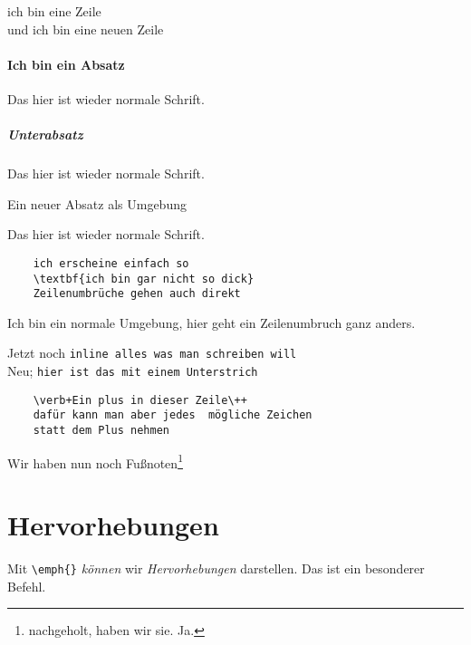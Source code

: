     ich bin eine Zeile\\
    und ich bin eine neuen Zeile
    
    \paragraph{Ich bin ein Absatz \blindtext}
        Das hier ist wieder normale Schrift.
    \subparagraph{Unterabsatz \blindtext}
        Das hier ist wieder normale Schrift.
    
    \begin{paragraph}
        Ein neuer Absatz als Umgebung \blindtext
    \end{paragraph}

    Das hier ist wieder normale Schrift.
    
    \begin{verbatim}
    ich erscheine einfach so
    \textbf{ich bin gar nicht so dick}
    Zeilenumbrüche gehen auch direkt
    \end{verbatim}
    
    Ich bin ein normale Umgebung, hier geht
    ein Zeilenumbruch ganz anders.
    
    Jetzt noch \verb+inline alles was man schreiben will+ \\
    Neu; \verb_hier ist das mit einem Unterstrich_ \\
    
    \begin{verbatim}
    \verb+Ein plus in dieser Zeile\++
    dafür kann man aber jedes  mögliche Zeichen
    statt dem Plus nehmen
    \end{verbatim}

    
    Wir haben nun noch Fußnoten\footnote{nachgeholt, haben wir sie. Ja.}
    
    \section{Hervorhebungen}
    
    Mit \verb|\emph{}| \emph{können} wir \emph{Hervorhebungen} darstellen.
    Das ist ein besonderer Befehl.
    